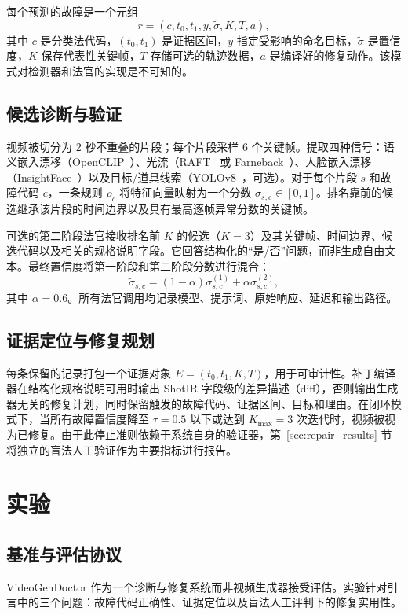 \documentclass{article}
\begin{document}
每个预测的故障是一个元组
\[
r=(c,t_0,t_1,y,\tilde{\sigma},K,T,a),
\]
其中 $c$ 是分类法代码，$(t_0,t_1)$ 是证据区间，$y$ 指定受影响的命名目标，$\tilde{\sigma}$ 是置信度，$K$ 保存代表性关键帧，$T$ 存储可选的轨迹数据，$a$ 是编译好的修复动作。该模式对检测器和法官的实现是不可知的。

\subsection{候选诊断与验证}
视频被切分为 2 秒不重叠的片段；每个片段采样 6 个关键帧。提取四种信号：语义嵌入漂移（OpenCLIP~\cite{openclip2023}）、光流（RAFT~\cite{raft2020} 或 Farneback~\cite{opencv2000,farneback2003}）、人脸嵌入漂移（InsightFace~\cite{arcface2019}）以及目标/道具线索（YOLOv8~\cite{yolov8}，可选）。对于每个片段 $s$ 和故障代码 $c$，一条规则 $\rho_c$ 将特征向量映射为一个分数 $\sigma_{s,c}\in[0,1]$。排名靠前的候选继承该片段的时间边界以及具有最高逐帧异常分数的关键帧。

可选的第二阶段法官接收排名前 $K$ 的候选（$K=3$）及其关键帧、时间边界、候选代码以及相关的规格说明字段。它回答结构化的“是/否”问题，而非生成自由文本。最终置信度将第一阶段和第二阶段分数进行混合：
\[
\tilde{\sigma}_{s,c}=(1-\alpha)\sigma^{(1)}_{s,c}+\alpha\sigma^{(2)}_{s,c},
\]
其中 $\alpha=0.6$。所有法官调用均记录模型、提示词、原始响应、延迟和输出路径。

\subsection{证据定位与修复规划}
每条保留的记录打包一个证据对象 $E=(t_0,t_1,K,T)$，用于可审计性。补丁编译器在结构化规格说明可用时输出 ShotIR 字段级的差异描述（diff），否则输出生成器无关的修复计划，同时保留触发的故障代码、证据区间、目标和理由。在闭环模式下，当所有故障置信度降至 $\tau=0.5$ 以下或达到 $K_{\max}=3$ 次迭代时，视频被视为已修复。由于此停止准则依赖于系统自身的验证器，第~\ref{sec:repair_results} 节将独立的盲法人工验证作为主要指标进行报告。

\section{实验}
\label{sec:setup}
\label{sec:experiments}

\subsection{基准与评估协议}
\label{sec:dataset}
VideoGenDoctor 作为一个诊断与修复系统而非视频生成器接受评估。实验针对引言中的三个问题：故障代码正确性、证据定位以及盲法人工评判下的修复实用性。
\end{document}
